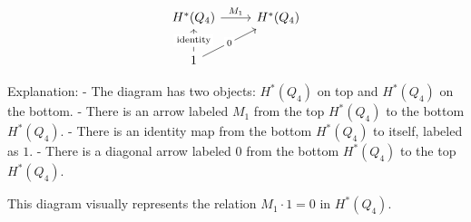 \documentclass{article}
\begin{document}
\[
\begin{tikzcd}
H^*(Q_4) \arrow[r, "M_1"] & H^*(Q_4) \\
1 \arrow[u, "\text{identity}" description] \arrow[ru, "0" description]
\end{tikzcd}
\]

Explanation:
- The diagram has two objects: \( H^*(Q_4) \) on top and \( H^*(Q_4) \) on the bottom.
- There is an arrow labeled \( M_1 \) from the top \( H^*(Q_4) \) to the bottom \( H^*(Q_4) \).
- There is an identity map from the bottom \( H^*(Q_4) \) to itself, labeled as \( 1 \).
- There is a diagonal arrow labeled \( 0 \) from the bottom \( H^*(Q_4) \) to the top \( H^*(Q_4) \).

This diagram visually represents the relation \( M_1 \cdot 1 = 0 \) in \( H^*(Q_4) \).
\end{document}
